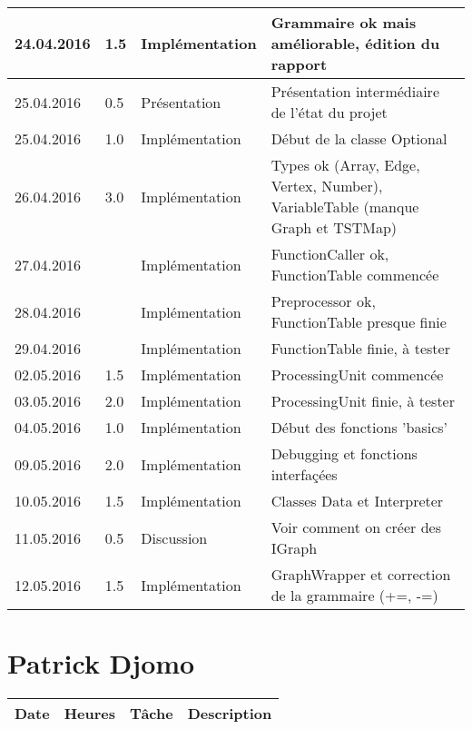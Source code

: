 \documentclass[french]{article}
\begin{document}
\begin{tabular}{p{}|p{}|p{}|p{}}
		24.04.2016 & 1.5 & Implémentation & Grammaire ok mais améliorable, édition du rapport\\ 
		\hline
		25.04.2016 & 0.5 & Présentation & Présentation intermédiaire de l'état du projet\\
		25.04.2016 & 1.0 & Implémentation & Début de la classe Optional\\
		26.04.2016 & 3.0 & Implémentation & Types ok (Array, Edge, Vertex, Number), VariableTable (manque Graph et TSTMap)\\
		27.04.2016 & & Implémentation & FunctionCaller ok, FunctionTable commencée\\
		28.04.2016 & & Implémentation & Preprocessor ok, FunctionTable presque finie\\
		29.04.2016 & & Implémentation & FunctionTable finie, à tester\\
		\hline
		02.05.2016 & 1.5 & Implémentation & ProcessingUnit commencée\\
		03.05.2016 & 2.0 & Implémentation & ProcessingUnit finie, à tester\\
		04.05.2016 & 1.0 & Implémentation & Début des fonctions 'basics'\\
		\hline 
		09.05.2016 & 2.0 & Implémentation & Debugging et fonctions interfaçées\\
		10.05.2016 & 1.5 & Implémentation & Classes Data et Interpreter\\
		11.05.2016 & 0.5 & Discussion & Voir comment on créer des IGraph\\
		12.05.2016 & 1.5 & Implémentation & GraphWrapper et correction de la grammaire (+=, -=)\\
	\end{tabular}
	
	\section*{Patrick Djomo}
	\begin{tabular}{p{}|p{}|p{}|p{}}
		Date&Heures&Tâche&Description\\
		\hline
	\end{tabular}
	
\end{document}
